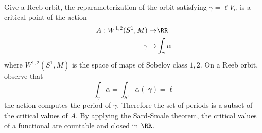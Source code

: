 
    Give a Reeb orbit, the reparameterization of the orbit satisfying $\dot \gamma = \ell V_\alpha$ is a critical point of the action 
    \begin{align*}
        A:W^{1,2}(S^1, M)\to& \RR\\
        \gamma\mapsto& \int_{\gamma}\alpha
    \end{align*}
    where $W^{1,2}(S^1, M)$ is the space of maps of Sobelov class $1,2$.
    On a Reeb orbit, observe that 
    \[\int_{\gamma}\alpha= \int_{S^1} \alpha(\cdot \gamma) = \ell\]
    the action computes the period of $\gamma$. Therefore the set of periods is a subset of the critical values of $A$. By applying the Sard-Smale theorem, the critical values of a functional are countable and closed in $\RR$.
